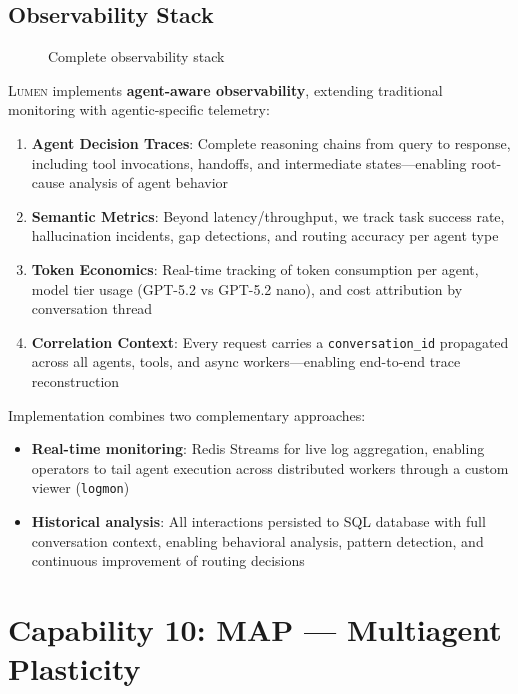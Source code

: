 \documentclass[11pt,a4paper]{article}
\theoremstyle{definition}
\theoremstyle{remark}
\newcommand{\lumen}{\textsc{Lumen}\xspace}
\begin{document}
\subsection{Observability Stack}

\begin{figure}[H]
    \centering
    
    \caption{Complete observability stack}
    \label{fig:observability}
\end{figure}

\lumen implements \textbf{agent-aware observability}, extending traditional monitoring with agentic-specific telemetry:

\begin{enumerate}
    \item \textbf{Agent Decision Traces}: Complete reasoning chains from query to response, including tool invocations, handoffs, and intermediate states---enabling root-cause analysis of agent behavior

    \item \textbf{Semantic Metrics}: Beyond latency/throughput, we track task success rate, hallucination incidents, gap detections, and routing accuracy per agent type

    \item \textbf{Token Economics}: Real-time tracking of token consumption per agent, model tier usage (GPT-5.2 vs GPT-5.2 nano), and cost attribution by conversation thread

    \item \textbf{Correlation Context}: Every request carries a \texttt{conversation\_id} propagated across all agents, tools, and async workers---enabling end-to-end trace reconstruction
\end{enumerate}

Implementation combines two complementary approaches:
\begin{itemize}
    \item \textbf{Real-time monitoring}: Redis Streams for live log aggregation, enabling operators to tail agent execution across distributed workers through a custom viewer (\texttt{logmon})
    \item \textbf{Historical analysis}: All interactions persisted to SQL database with full conversation context, enabling behavioral analysis, pattern detection, and continuous improvement of routing decisions
\end{itemize}

\section{Capability 10: MAP --- Multiagent Plasticity}
\label{sec:map}
\end{document}
